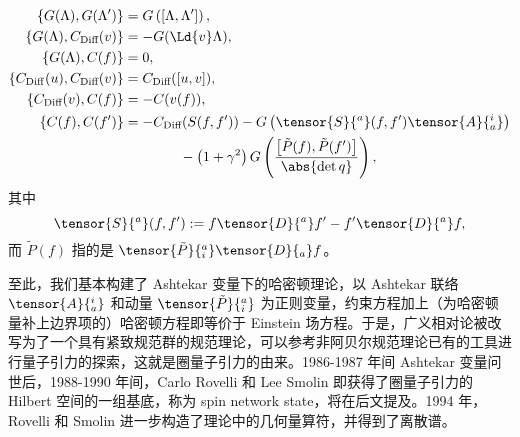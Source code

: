 	\begin{Property}
		\begin{equation}
			\begin{split}
				\left\{ G(\Lambda), G(\Lambda') \right\} &= G\left( \left[ \Lambda, \Lambda' \right] \right),\\
				\left\{ G(\Lambda), C_{\text{Diff}}(v) \right\} &= - G(\Ld{v} \Lambda),\\
				\left\{ G(\Lambda), C(f) \right\} &= 0,\\
				\left\{ C_{\mathrm{Diff}}(u), C_{\text{Diff}}(v) \right\} &= C_{\text{Diff}}([u,v]),\\
				\left\{ C_{\text{Diff}}(v), C(f) \right\} &= - C(v(f)),\\
				\left\{ C(f), C(f') \right\} &= - C_{\text{Diff}}(S(f,f')) - G\left(\tensor{S}{^a}(f,f') \tensor{A}{^i_a} \right)\\
				&\qquad\qquad - \left( 1+\gamma^2 \right) G\left( \frac{\left[ \tilde{P}(f), \tilde{P}(f') \right]}{\abs{\det q}} \right),\label{eq-constrain_algebra}
			\end{split}
		\end{equation}
		其中
		\begin{equation}
			\tensor{S}{^a}(f,f') := f \tensor{D}{^a} f' - f' \tensor{D}{^a} f,
		\end{equation}
		而 $\tilde{P}(f)$ 指的是 $\tensor{\tilde{P}}{^a_i} \tensor{D}{_a} f$。
	\end{Property}

	至此，我们基本构建了 Ashtekar 变量下的哈密顿理论，以 Ashtekar 联络 $\tensor{A}{^i_a}$ 和动量 $\tensor{\tilde{P}}{^a_i}$ 为正则变量，约束方程加上（为哈密顿量补上边界项的）哈密顿方程即等价于 Einstein 场方程。于是，广义相对论被改写为了一个具有紧致规范群的规范理论，可以参考非阿贝尔规范理论已有的工具进行量子引力的探索，这就是圈量子引力的由来。1986-1987 年间 Ashtekar 变量问世后，1988-1990 年间，Carlo Rovelli 和 Lee Smolin 即获得了圈量子引力的 Hilbert 空间的一组基底\cite{Rovelli1988,Rovelli1989}，称为 spin network state，将在后文提及。1994 年，Rovelli 和 Smolin 进一步构造了理论中的几何量算符，并得到了离散谱\cite{Rovelli1994}。
	
